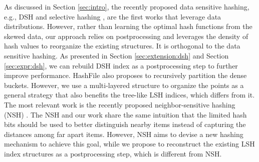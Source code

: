  As discussed in Section \ref{sec:intro}, the recently proposed data sensitive hashing, e.g., DSH \cite{Gao:2014:DDS:2588555.2588565} and selective hashing \cite{Gao:2015:SHC:2783258.2783284}, are the first works that leverage data distributions. However, rather than learning the optimal hash functions from the skewed data, our approach relies on postprocessing and leverages the density of hash values to reorganize the existing structures. It is orthogonal to the data sensitive hashing. As presented in Section \ref{sec:extension:dsh} and Section \ref{sec:expr:dsh}, we can rebuild DSH index as a postprocessing step to further improve performance. HashFile \cite{Zhang:2011:HEI:2004686.2005629} also proposes to recursively partition the dense buckets. However, we use a multi-layered structure to organize the points as a general strategy that also benefits the tree-like LSH indices, which differs from it. The most relevant work is the recently proposed neighbor-sensitive hashing (NSH) \cite{Park:2015:NH:2850583.2850589}. The NSH and our work share the same intuition that the limited hash bits should be used to better distinguish nearby items instead of capturing the distances among far apart items. However, NSH aims to devise a new hashing mechanism to achieve this goal, while we propose to reconstruct the existing LSH index structures as a postprocessing step, which is different from NSH.


